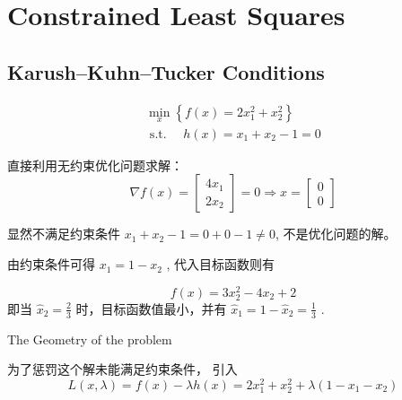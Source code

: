 \chapter{Constrained Least Squares}

\section{Karush–Kuhn–Tucker Conditions}

\begin{problem}
    \begin{equation}
\begin{array}{l}
\min _{x}\left\{f(x)=2 x_{1}^{2}+x_{2}^{2}\right\} \\
\text { s.t. } \quad h(x)=x_{1}+x_{2}-1=0
\end{array}
\end{equation}

直接利用无约束优化问题求解： 
\begin{equation} \nabla f(x)=\left[\begin{array}{l}4 x_{1} \\ 2 x_{2}\end{array}\right]=0 \Rightarrow x=\left[\begin{array}{l}0 \\ 0\end{array}\right] \end{equation}

显然不满足约束条件 $ x_{1}+x_{2}-1=0+0-1 \neq 0 $, 不是优化问题的解。
\end{problem}

由约束条件可得 $ x_{1}=1-x_{2} $ , 代入目标函数则有

\begin{equation} f(x)=3 x_{2}^{2}-4 x_{2}+2 \end{equation}
即当 $ \hat{x}_{2}=\frac{2}{3} $ 时，目标函数值最小，并有 $ \hat{x}_{1}=1-\hat{x}_{2}=\frac{1}{3} $ .

\begin{FigureCenter}{The Geometry of the problem}
    \label{fig:geometry-of-the-problem}
    
\end{FigureCenter}

为了惩罚这个解未能满足约束条件， 引入
\begin{equation}
L(x, \lambda)=f(x)-\lambda h(x)=2 x_{1}^{2}+x_{2}^{2}+\lambda\left(1-x_{1}-x_{2}\right)
\end{equation}

